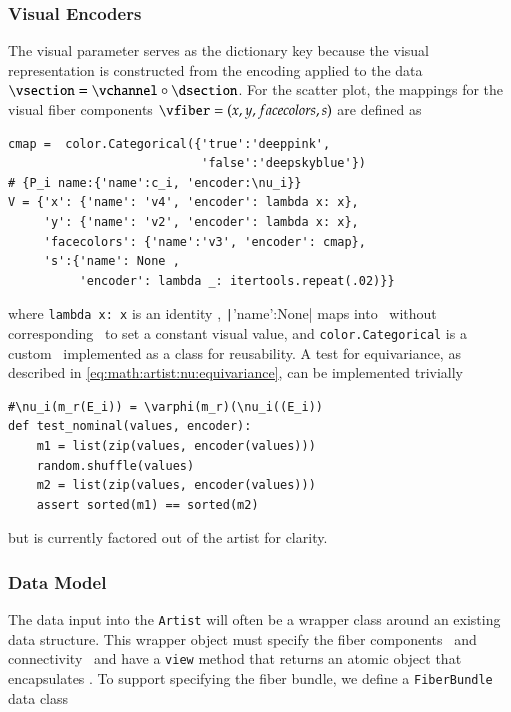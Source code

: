 \documentclass[journal]{vgtc}                %
\begin{document}
\subsubsection{Visual Encoders}
The visual parameter serves as the dictionary key because the visual representation is constructed from the encoding applied to the data  $\vsection = \vchannel \circ \dsection$. For the scatter plot, the mappings for the visual fiber components $\vfiber=(x,y, facecolors, s)$ are defined as
\begin{verbatim}
cmap =  color.Categorical({'true':'deeppink', 
                           'false':'deepskyblue'}) 
# {P_i name:{'name':c_i, 'encoder:\nu_i}}
V = {'x': {'name': 'v4', 'encoder': lambda x: x}, 
     'y': {'name': 'v2', 'encoder': lambda x: x},
     'facecolors': {'name':'v3', 'encoder': cmap}, 
     's':{'name': None , 
          'encoder': lambda _: itertools.repeat(.02)}}
\end{verbatim}
where \texttt{lambda x: x} is an identity \vchannel, \texttt|{'name':None}| maps into \vfiber\ without corresponding \dsection\ to set a constant visual value, and \texttt{color.Categorical} is a custom \vchannel\ implemented as a class for reusability.  A test for equivariance, as described in \autoref{eq:math:artist:nu:equivariance}, can be implemented trivially
\begin{verbatim}
#\nu_i(m_r(E_i)) = \varphi(m_r)(\nu_i((E_i))
def test_nominal(values, encoder):
    m1 = list(zip(values, encoder(values)))
    random.shuffle(values)
    m2 = list(zip(values, encoder(values)))
    assert sorted(m1) == sorted(m2)
\end{verbatim}
but is currently factored out of the artist for clarity. 

\subsubsection{Data Model}
The data input into the \texttt{Artist} will often be a wrapper class around an existing data structure. This wrapper object must specify the fiber components \dfiber\ and connectivity \dbase\ and have a \texttt{view} method that returns an atomic object that encapsulates \dsection. To support specifying the fiber bundle, we define a \texttt{FiberBundle} data class\cite{DataclassesDataClasses}
\end{document}
